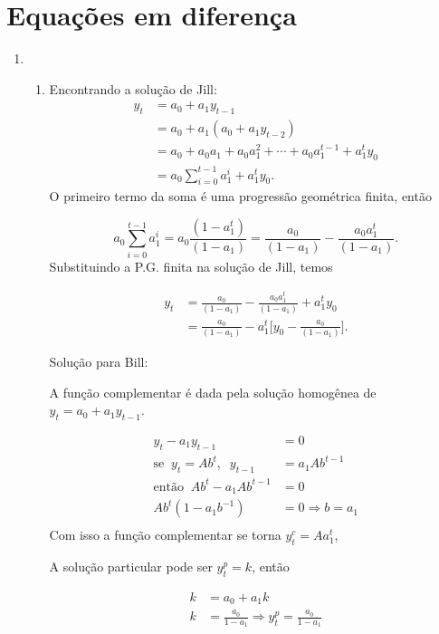 \chapter{Equações em diferença}

\begin{enumerate}
	\item	
	\begin{enumerate}
		\item 
	 
	
	Encontrando a solução de Jill:
	\begin{align*}
		y_t&=a_0+a_1y_{t-1}\\
		&= a_0+a_1(a_0+a_1y_{t-2})\\
		&=a_0+a_0a_1+a_0a_1^2+\cdots+a_0a_1^{t-1}+a_1^ty_0\\
		&= a_0\sum_{i=0}^{t-1}a_1^{i}+a_1^ty_0.
	\end{align*}
	O primeiro termo da soma é uma progressão geométrica finita, então
	
	\begin{equation*}
		a_0\sum_{i=0}^{t-1}a_1^i=a_0\frac{(1-a_1^{t})}{(1-a_1)}=\frac{a_0}{(1-a_1)}-\frac{a_0a_1^{t}}{(1-a_1)}.
	\end{equation*}
	 Substituindo a P.G. finita na solução de Jill, temos
	
	\begin{align*}
		y_t&=\frac{a_0}{(1-a_1)}-\frac{a_0a_1^{t}}{(1-a_1)}+a_1^ty_0\\
		&=\frac{a_0}{(1-a_1)}-a_1^t\bigg[y_0-\frac{a_0}{(1-a_1)}\bigg].
	\end{align*}
	
	Solução para Bill:
		
	A função complementar é dada pela solução homogênea de $y_t=a_0+a_1y_{t-1}$.
	
	\begin{align*}
		y_t-a_1y_{t-1}&=0\\
		\text{se}\;\;y_t=Ab^t,\;\;y_{t-1}&=a_1Ab^{t-1}\\
		\text{então}\;\;Ab^t-a_1Ab^{t-1}&=0\\
		Ab^t({1-a_1b^{-1}})&=0 \Rightarrow b=a_1\\
	\end{align*}
	Com isso a função complementar se torna $y_t^c=Aa_1^t$, 
	
	A solução particular pode ser $y_t^p=k$, então
	
	\begin{align*}
	k&=a_0+a_1k\\
	k&=\frac{a_0}{1-a_1}\Rightarrow y^p_t=\frac{a_0}{1-a_1}
	\end{align*}
	

\end{enumerate}
\end{enumerate}
